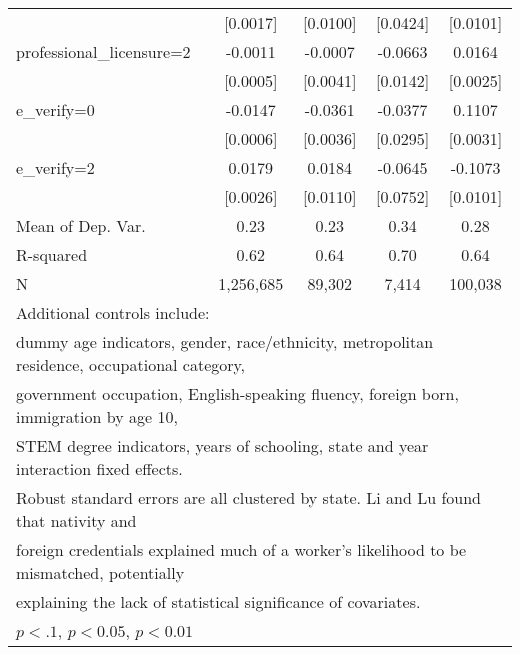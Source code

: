 \begin{table}[htbp]
\begin{tabular}{l*{4}{c}}
                    &    [0.0017]         &    [0.0100]         &    [0.0424]         &    [0.0101]         \\
\addlinespace
professional\_licensure=2&     -0.0011\sym{**} &     -0.0007         &     -0.0663\sym{***}&      0.0164\sym{***}\\
                    &    [0.0005]         &    [0.0041]         &    [0.0142]         &    [0.0025]         \\
\addlinespace
e\_verify=0          &     -0.0147\sym{***}&     -0.0361\sym{***}&     -0.0377         &      0.1107\sym{***}\\
                    &    [0.0006]         &    [0.0036]         &    [0.0295]         &    [0.0031]         \\
\addlinespace
e\_verify=2          &      0.0179\sym{***}&      0.0184         &     -0.0645         &     -0.1073\sym{***}\\
                    &    [0.0026]         &    [0.0110]         &    [0.0752]         &    [0.0101]         \\
\midrule
Mean of Dep. Var.   &        0.23         &        0.23         &        0.34         &        0.28         \\
R-squared           &        0.62         &        0.64         &        0.70         &        0.64         \\
N                   &   1,256,685         &      89,302         &       7,414         &     100,038         \\
\bottomrule
\multicolumn{5}{l}{\footnotesize Additional controls include:}\\
\multicolumn{5}{l}{\footnotesize dummy age indicators, gender, race/ethnicity, metropolitan residence, occupational category,}\\
\multicolumn{5}{l}{\footnotesize government occupation, English-speaking fluency, foreign born, immigration by age 10,}\\
\multicolumn{5}{l}{\footnotesize STEM degree indicators, years of schooling, state and year interaction fixed effects.}\\
\multicolumn{5}{l}{\footnotesize Robust standard errors are all clustered by state. Li and Lu found that nativity and}\\
\multicolumn{5}{l}{\footnotesize foreign credentials explained much of a worker's likelihood to be mismatched, potentially}\\
\multicolumn{5}{l}{\footnotesize explaining the lack of statistical significance of covariates.}\\
\multicolumn{5}{l}{\footnotesize \sym{*} \(p<.1\), \sym{**} \(p<0.05\), \sym{***} \(p<0.01\)}\\
\end{tabular}
\end{table}
